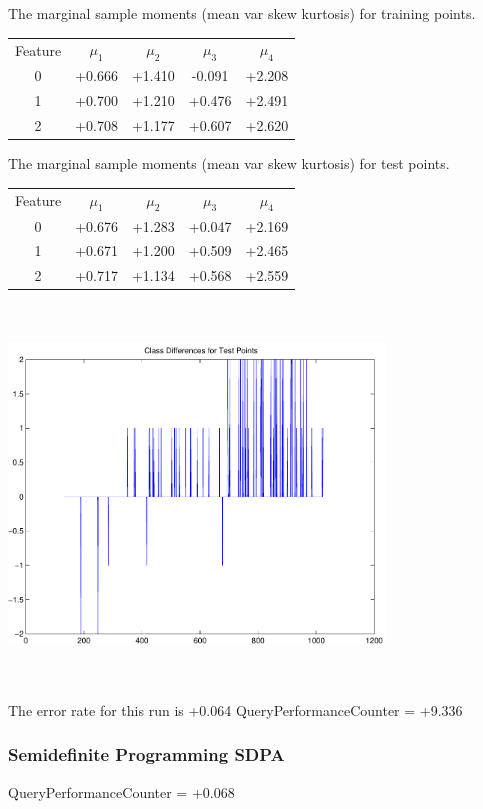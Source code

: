 \documentclass[9pt]{article}
\theoremstyle{plain}
\theoremstyle{definition}
\theoremstyle{remark}
\numberwithin{equation}{section}
\begin{document}
The marginal sample moments (mean var skew kurtosis) for training points.\newline
\begin{tabular}{ c |  c  c  c  c}
Feature & $\mu_1$ & $\mu_2$ & $\mu_3$ & $\mu_4$ \\
0 & +0.666 & +1.410 & -0.091& +2.208 \\
\hline
1 & +0.700 & +1.210 & +0.476& +2.491 \\
\hline
2 & +0.708 & +1.177 & +0.607& +2.620 \\
\hline
\end{tabular}
\newline
The marginal sample moments (mean var skew kurtosis) for test points.\newline
\begin{tabular}{ c | c  c  c  c}
Feature & $\mu_1$ & $\mu_2$ & $\mu_3$ & $\mu_4$ \\
0 & +0.676 & +1.283 & +0.047& +2.169\\
\hline
1 & +0.671 & +1.200 & +0.509& +2.465\\
\hline
2 & +0.717 & +1.134 & +0.568& +2.559\\
\hline
\end{tabular}\newline
\includegraphics[width=10.0cm,height=10.0cm]{classDiffs.pdf}

The error rate for this run is +0.064\newline
QueryPerformanceCounter  =  +9.336
\subsubsection{Semidefinite Programming SDPA}
QueryPerformanceCounter  =  +0.068
\end{document}
